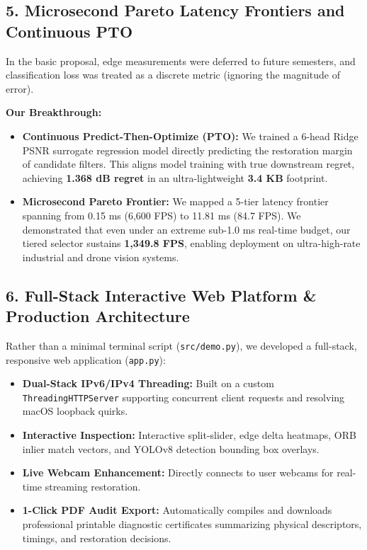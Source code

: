 \documentclass[10pt,a4paper]{article}
\begin{document}
\newpage

\subsection{5. Microsecond Pareto Latency Frontiers and Continuous PTO}
In the basic proposal, edge measurements were deferred to future semesters, and classification loss was treated as a discrete metric (ignoring the magnitude of error).

\textbf{Our Breakthrough:}
\begin{itemize}[noitemsep]
    \item \textbf{Continuous Predict-Then-Optimize (PTO):} We trained a 6-head Ridge PSNR surrogate regression model directly predicting the restoration margin of candidate filters. This aligns model training with true downstream regret, achieving \textbf{1.368 dB regret} in an ultra-lightweight \textbf{3.4 KB} footprint.
    \item \textbf{Microsecond Pareto Frontier:} We mapped a 5-tier latency frontier spanning from 0.15 ms (6,600 FPS) to 11.81 ms (84.7 FPS). We demonstrated that even under an extreme sub-1.0 ms real-time budget, our tiered selector sustains \textbf{1,349.8 FPS}, enabling deployment on ultra-high-rate industrial and drone vision systems.
\end{itemize}

\subsection{6. Full-Stack Interactive Web Platform \& Production Architecture}
Rather than a minimal terminal script (\texttt{src/demo.py}), we developed a full-stack, responsive web application (\texttt{app.py}):
\begin{itemize}[noitemsep]
    \item \textbf{Dual-Stack IPv6/IPv4 Threading:} Built on a custom \texttt{ThreadingHTTPServer} supporting concurrent client requests and resolving macOS loopback quirks.
    \item \textbf{Interactive Inspection:} Interactive split-slider, edge delta heatmaps, ORB inlier match vectors, and YOLOv8 detection bounding box overlays.
    \item \textbf{Live Webcam Enhancement:} Directly connects to user webcams for real-time streaming restoration.
    \item \textbf{1-Click PDF Audit Export:} Automatically compiles and downloads professional printable diagnostic certificates summarizing physical descriptors, timings, and restoration decisions.
\end{itemize}
\end{document}
